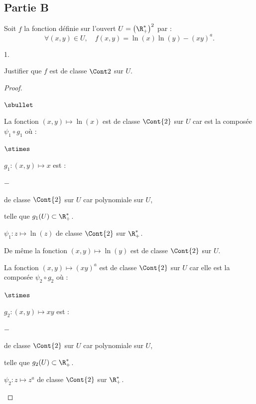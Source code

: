 \subsection*{Partie B}
\noindent
Soit $f$ la fonction définie sur l'ouvert $U=\left(\R_+^*\right)^2$
par :
\[
\forall (x,y)\in U, \quad f(x,y)=\ln(x)\ln(y)-(xy)^a.
\]
\begin{noliste}{1.}
  \setcounter{enumi}{3}
\item Justifier que $f$ est de classe $\Cont 2$ sur $U$.
  
  \begin{proof}~
    \begin{noliste}{$\sbullet$}
    \item La fonction $(x,y) \mapsto \ln(x)$ est de classe $\Cont{2}$
      sur $U$ car est la composée $\psi_1 \circ g_1$ où :
      \begin{noliste}{$\stimes$}
      \item $g_1 : (x,y)\mapsto x$ est :
        \begin{noliste}{$-$}
        \item de classe $\Cont{2}$ sur $U$ car polynomiale sur $U$,
        \item telle que $g_1(U) \subset \R_+^*$.
        \end{noliste}
        
      \item $\psi_1 : z \mapsto \ln(z)$ de classe $\Cont{2}$ sur
        $\R_+^*$.
      \end{noliste}
      
    \item De même la fonction $(x,y) \mapsto \ln(y)$ est de classe
      $\Cont{2}$ sur $U$.
      
    \item La fonction $(x,y) \mapsto (xy)^a$ est de classe $\Cont{2}$
      sur $U$ car elle est la composée $\psi_2 \circ g_2$ où :
      \begin{noliste}{$\stimes$}
      \item $g_2 : (x,y) \mapsto xy$ est :
        \begin{noliste}{$-$}
        \item de classe $\Cont{2}$ sur $U$ car polynomiale sur $U$,
        \item telle que $g_2(U) \subset \R_+^*$.
        \end{noliste}
        
      \item $\psi_2 : z \mapsto z^a$ de classe $\Cont{2}$ sur
        $\R_+^*$.
      \end{noliste}
    \end{noliste}
    

\end{proof}
\end{noliste}
